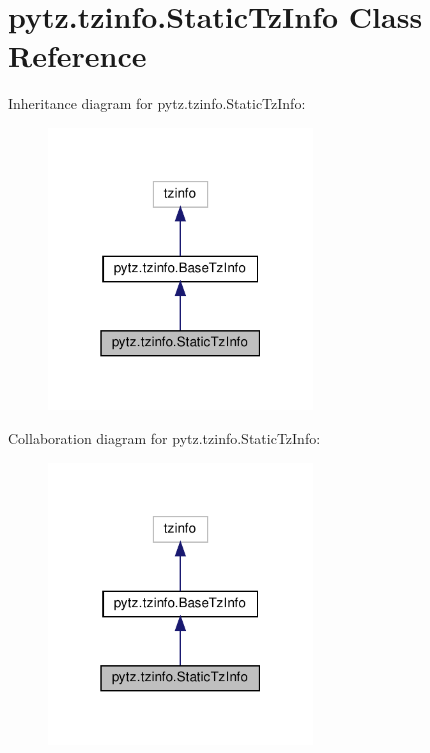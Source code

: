 \hypertarget{classpytz_1_1tzinfo_1_1StaticTzInfo}{}\section{pytz.\+tzinfo.\+Static\+Tz\+Info Class Reference}
\label{classpytz_1_1tzinfo_1_1StaticTzInfo}


Inheritance diagram for pytz.\+tzinfo.\+Static\+Tz\+Info\+:
\nopagebreak
\begin{figure}[H]
\begin{center}
\leavevmode
\includegraphics[width=199pt]{classpytz_1_1tzinfo_1_1StaticTzInfo__inherit__graph}
\end{center}
\end{figure}


Collaboration diagram for pytz.\+tzinfo.\+Static\+Tz\+Info\+:
\nopagebreak
\begin{figure}[H]
\begin{center}
\leavevmode
\includegraphics[width=199pt]{classpytz_1_1tzinfo_1_1StaticTzInfo__coll__graph}
\end{center}
\end{figure}
